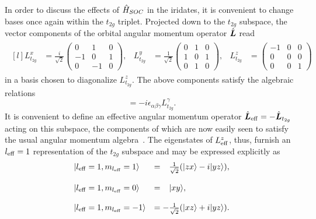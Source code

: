 In order to discuss the effects of $\hat{H}_{SOC}$ in the iridates, it is convenient to change bases once again within the $t_{2g}$ triplet.
Projected down to the $t_{2g}$ subspace, the vector components of the orbital angular momentum operator $\hat{\bm{L}}$ read
%
\begin{align}
	\begin{matrix*}[l]
		L^x_{t_{2g}} &= \frac{i}{\sqrt{2}}
			\begin{pmatrix}
				0	&	1	&	0	\\
				-1	&	0	&	1	\\
				0	&	-1	&	0
			\end{pmatrix},
		&
		L^y_{t_{2g}} &= \frac{1}{\sqrt{2}}
			\begin{pmatrix}
				0	&	1	&	0	\\
				1	&	0	&	1	\\
				0	&	1	&	0
			\end{pmatrix},
		&
		L^z_{t_{2g}} &=
			\begin{pmatrix}
				-1	&	0	&	0	\\
				0	&	0	&	0	\\
				0	&	0	&	1	
			\end{pmatrix}
	\end{matrix*}
\end{align}
%
in a basis chosen to diagonalize $L^z_{t_{2g}}$.
The above components satisfy the algebraic relations
%
\begin{equation}
	[L^{\alpha}_{t_{2g}}, L^{\beta}_{t_{2g}}] = -i \epsilon_{\alpha\beta\gamma} L^{\gamma}_{t_{2g}}.
\end{equation}
%
It is convenient to define an effective angular momentum operator $\hat{\bm{L}}_{\rm eff} = -\hat{\bm{L}}_{t_{2g}}$ acting on this subspace, the components of which are now easily seen to satisfy the usual angular momentum algebra~\cite{AbragamPRSL1951}.
The eigenstates of $L^z_{\rm eff}$, thus, furnish an $l_{\rm eff} = 1$ representation of the $t_{2g}$ subspace and may be expressed explicitly as
%
\begin{equation}
	\begin{matrix*}[l]
	\ket{l_{\rm eff} = 1, m_{l_{\rm eff}} = 1}	& = \phantom{-}\frac{1}{\sqrt{2}} (\ket{zx} - i \ket{yz}), \\
	&\\
	\ket{l_{\rm eff} = 1, m_{l_{\rm eff}} = 0}	& = \phantom{-}\ket{xy}, \\
	&\\
	\ket{l_{\rm eff} = 1, m_{l_{\rm eff}} = -1}	& = -\frac{1}{\sqrt{2}} (\ket{xz} + i \ket{yz}).
	\end{matrix*}
	\label{eq:chapter03_OrbitalsLeff}
\end{equation}
%

